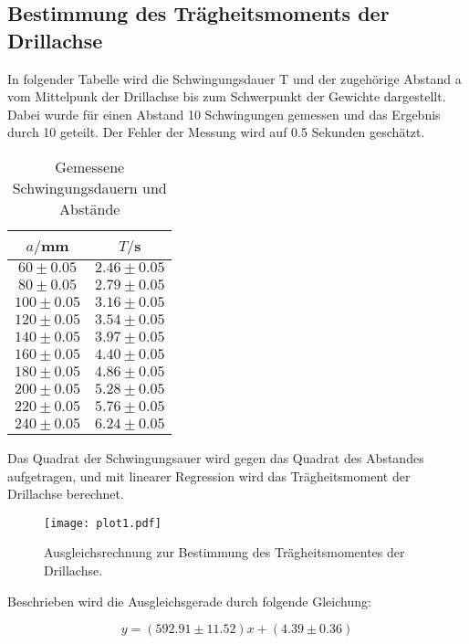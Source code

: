 \subsection{Bestimmung des Trägheitsmoments der Drillachse}
In folgender Tabelle wird die Schwingungsdauer T und der zugehörige Abstand a vom Mittelpunk der Drillachse bis 
zum Schwerpunkt der Gewichte dargestellt. Dabei wurde für einen Abstand 10 Schwingungen gemessen und das Ergebnis
durch 10 geteilt. Der Fehler der Messung wird auf 0.5 Sekunden geschätzt.


\begin{table}[H]
  \centering
  \caption{Gemessene Schwingungsdauern und Abstände}
  \label{tab:Gemessene Schwingungsdauern und Abstände}
  \begin{tabular}{c c}
    \toprule
    $a/$mm & $T/$s \\
    \midrule
     $60 \pm 0.05$ & $2.46 \pm 0.05$ \\ 
     $80 \pm 0.05$ & $2.79 \pm 0.05$ \\
    $100 \pm 0.05$ & $3.16 \pm 0.05$ \\
    $120 \pm 0.05$ & $3.54 \pm 0.05$ \\
    $140 \pm 0.05$ & $3.97 \pm 0.05$ \\
    $160 \pm 0.05$ & $4.40 \pm 0.05$ \\
    $180 \pm 0.05$ & $4.86 \pm 0.05$ \\
    $200 \pm 0.05$ & $5.28 \pm 0.05$ \\
    $220 \pm 0.05$ & $5.76 \pm 0.05$ \\
    $240 \pm 0.05$ & $6.24 \pm 0.05$ \\
    \bottomrule
  \end{tabular}
\end{table} 


Das Quadrat der Schwingungsauer wird gegen das Quadrat des Abstandes aufgetragen, und mit linearer Regression wird das Trägheitsmoment
der Drillachse berechnet. 

\begin{figure}[H]
  \centering
  \texttt{[image: plot1.pdf]}
  \caption{Ausgleichsrechnung zur Bestimmung des Trägheitsmomentes der Drillachse.}
  \label{fig:plot}
\end{figure}

Beschrieben wird die Ausgleichsgerade durch folgende Gleichung:

\begin{equation}
  y = (592.91 \pm 11.52)x + (4.39 \pm 0.36)
\end{equation}

